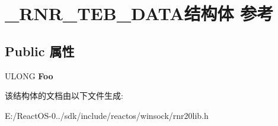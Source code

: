 \hypertarget{struct___r_n_r___t_e_b___d_a_t_a}{}\section{\+\_\+\+R\+N\+R\+\_\+\+T\+E\+B\+\_\+\+D\+A\+T\+A结构体 参考}
\label{struct___r_n_r___t_e_b___d_a_t_a}
\subsection*{Public 属性}
\begin{DoxyCompactItemize}
\item 
\mbox{\label{struct___r_n_r___t_e_b___d_a_t_a_a553dcbc01d6a8faa49629bdea5ec3c88}} 
U\+L\+O\+NG {\bfseries Foo}
\end{DoxyCompactItemize}


该结构体的文档由以下文件生成\+:\begin{DoxyCompactItemize}
\item 
E\+:/\+React\+O\+S-\/0../sdk/include/reactos/winsock/rnr20lib.\+h\end{DoxyCompactItemize}
